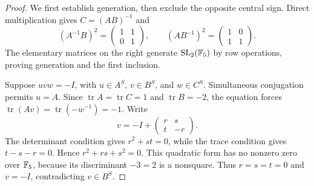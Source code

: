 \begin{proof}
We first establish generation, then exclude the opposite central sign.
Direct multiplication gives $C=(AB)^{-1}$ and
\[
(A^{-1}B)^2=\begin{pmatrix}1&1\\0&1\end{pmatrix},\qquad
(AB^{-1})^2=\begin{pmatrix}1&0\\1&1\end{pmatrix}.
\]
The elementary matrices on the right generate $\operatorname{SL}_2(\mathbb F_5)$ by row
operations, proving generation and the first inclusion.

Suppose $uvw=-I$, with $u\in A^S$, $v\in B^S$, and $w\in C^S$.
Simultaneous conjugation permits $u=A$. Since
$\operatorname{tr} A=\operatorname{tr} C=1$ and $\operatorname{tr} B=-2$, the equation forces
$\operatorname{tr}(Av)=\operatorname{tr}(-w^{-1})=-1$. Write
\[
v=-I+\begin{pmatrix}r&s\\t&-r\end{pmatrix}.
\]
The determinant condition gives $r^2+st=0$, while the trace condition
gives $t-s-r=0$. Hence $r^2+rs+s^2=0$. This quadratic form has no
nonzero zero over $\mathbb F_5$, because its discriminant $-3=2$ is a
nonsquare. Thus $r=s=t=0$ and $v=-I$, contradicting $v\in B^S$.
\end{proof}

